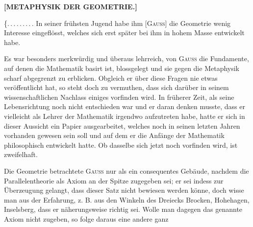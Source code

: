 \clearpage
{}%
\begin{center}
\textbf{[METAPHYSIK DER GEOMETRIE.]}

\end{center}

\{\mbox{.\,.\,.\,.\,.\,.\,.\,.\,.} In seiner frühsten Jugend habe ihm [\textsc{Gauss}] die Geometrie wenig Interesse eingeflösst, welches sich erst später bei ihm in hohem Masse entwickelt habe.

Es war besonders merkwürdig und überaus lehrreich, von \textsc{Gauss} die Fundamente, auf denen die Mathematik basirt ist, blossgelegt und sie gegen die Metaphysik scharf abgegrenzt zu erblicken. Obgleich er über diese Fragen nie etwas veröffentlicht hat, so steht doch zu vermuthen, dass sich darüber in seinem wissenschaftlichen Nachlass einiges vorfinden wird. In früherer Zeit, als seine Lebensrichtung noch nicht entschieden war und er daran denken musste, dass er vielleicht als Lehrer der Mathematik irgendwo aufzutreten habe, hatte er sich in dieser Aussicht ein Papier ausgearbeitet, welches noch in seinen letzten Jahren vorhanden gewesen sein soll und auf dem er die Anfänge der Mathematik philosophisch entwickelt hatte. Ob dasselbe sich jetzt noch vorfinden wird, ist zweifelhaft.

Die Geometrie betrachtete \textsc{Gauss} nur als ein consequentes Gebäude, nachdem die Parallelentheorie als Axiom an der Spitze zugegeben sei; er sei indess zur Überzeugung gelangt, dass dieser Satz nicht bewiesen werden könne, doch wisse man aus der Erfahrung, z. B. aus den Winkeln des Dreiecks Brocken, Hohehagen, Inselsberg, dass er näherungsweise richtig sei. Wolle man dagegen das genannte Axiom nicht zugeben, so folge daraus eine andere ganz
